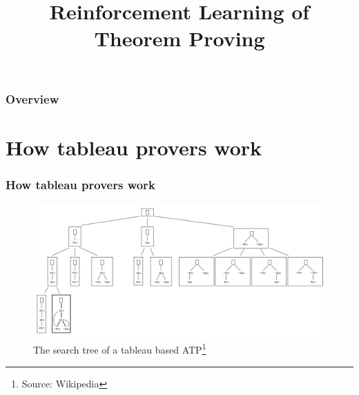 \documentclass{beamer}
\title[RL of Theorem Proving]{Reinforcement Learning of Theorem Proving} %
\begin{document}
\begin{frame}
\titlepage %
\end{frame}

\begin{frame}
\frametitle{Overview} %
\tableofcontents %
\end{frame}
\section{How tableau provers work} 

\begin{frame}
    \frametitle{How tableau provers work}
    \begin{figure}
    \includegraphics[width=\linewidth]{tableaux.png}
    \caption{The search tree of a tableau based ATP\footnote{Source: Wikipedia}}
    \end{figure}

\end{frame}
\end{document}
